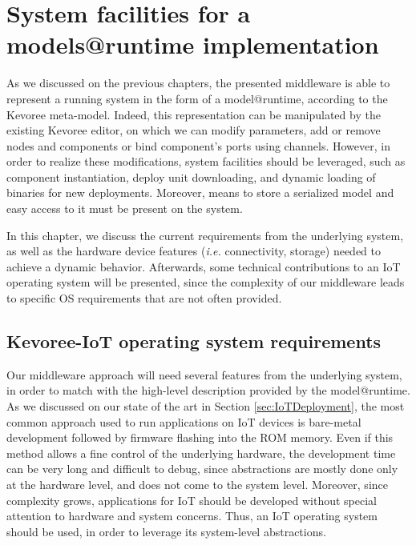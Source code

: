 \chapter{System facilities for a models@runtime implementation}
As we discussed on the previous chapters, the presented middleware is able to represent a running system in the form of a model@runtime, according to the Kevoree meta-model.
Indeed, this representation can be manipulated by the existing Kevoree editor, on which we can modify parameters, add or remove nodes and components or bind component's ports using channels.
However, in order to realize these modifications, system facilities should be leveraged, such as component instantiation, deploy unit downloading, and dynamic loading of binaries for new deployments.
Moreover, means to store a serialized model and easy access to it must be present on the system.

In this chapter, we discuss the current requirements from the underlying system, as well as the hardware device features (\textit{i.e.} connectivity, storage) needed to achieve a dynamic behavior.
Afterwards, some technical contributions to an IoT operating system will be presented, since the complexity of our middleware leads to specific OS requirements that are not often provided.

\section{Kevoree-IoT operating system requirements}
Our middleware approach will need several features from the underlying system, in order to match with the high-level description provided by the model@runtime.
As we discussed on our state of the art in Section \ref{sec:IoTDeployment}, the most common approach used to run applications on IoT devices is bare-metal development followed by firmware flashing into the ROM memory.
Even if this method allows a fine control of the underlying hardware, the development time can be very long and difficult to debug, since abstractions are mostly done only at the hardware level, and does not come to the system level.
Moreover, since complexity grows, applications for IoT should be developed without special attention to hardware and system concerns.
Thus, an IoT operating system should be used, in order to leverage its system-level abstractions.

